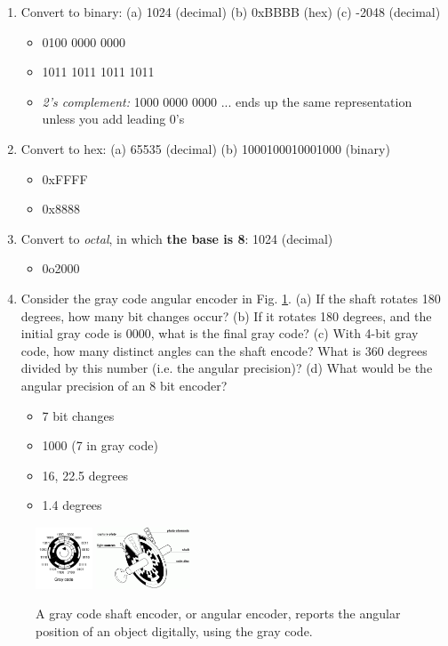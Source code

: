 \documentclass[10pt]{article}
\begin{document}
\begin{enumerate}
\item Convert to binary: (a) 1024 (decimal) (b) 0xBBBB (hex) (c) -2048 (decimal)
\begin{itemize}
\item 0100 0000 0000
\item 1011 1011 1011 1011
\item \textit{2's complement:} 1000 0000 0000 ... ends up the same representation unless you add leading 0's
\end{itemize}
\item Convert to hex: (a) 65535 (decimal) (b) 1000100010001000 (binary)
\begin{itemize}
\item 0xFFFF
\item 0x8888
\end{itemize}
\item Convert to \textit{octal}, in which \textbf{the base is 8}: 1024 (decimal)
\begin{itemize}
\item 0o2000
\end{itemize}
\item Consider the gray code angular encoder in Fig. \ref{fig:grayCode}.  (a) If the shaft rotates 180 degrees, how many bit changes occur?  (b) If it rotates 180 degrees, and the initial gray code is 0000, what is the final gray code?  (c) With 4-bit gray code, how many distinct angles can the shaft encode?  What is 360 degrees divided by this number (i.e. the angular precision)? (d) What would be the angular precision of an 8 bit encoder?
\begin{itemize}
\item 7 bit changes
\item 1000 (7 in gray code)
\item 16, 22.5 degrees
\item 1.4 degrees
\end{itemize}
\end{enumerate}
\begin{figure}[hb]
\centering
\includegraphics[width=0.15\textwidth]{grayCode1.png}
\includegraphics[width=0.25\textwidth]{grayCode2.png}
\caption{\label{fig:grayCode} A gray code shaft encoder, or angular encoder, reports the angular position of an object digitally, using the gray code.}
\end{figure}
\end{document}
